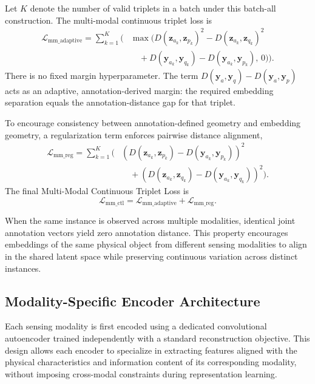 \documentclass[lettersize,journal]{IEEEtran}
\begin{document}
Let $K$ denote the number of valid triplets in a batch under this batch-all construction. The multi-modal continuous triplet loss is
\begin{equation}
\label{eq:mm-adaptive}
\begin{aligned}
\mathcal{L}_{\text{mm\_adaptive}}
=
\sum_{k=1}^{K}
\Big(
& \max\!\big(
D(\mathbf{z}_{a_k},\mathbf{z}_{p_k})^2
-
D(\mathbf{z}_{a_k},\mathbf{z}_{q_k})^2 \\
& \quad +
D(\mathbf{y}_{a_k},\mathbf{y}_{q_k})
-
D(\mathbf{y}_{a_k},\mathbf{y}_{p_k}),
\, 0
\big)
\Big).
\end{aligned}
\end{equation}
There is no fixed margin hyperparameter. The term $D(\mathbf{y}_{a},\mathbf{y}_{q})-D(\mathbf{y}_{a},\mathbf{y}_{p})$ acts as an adaptive, annotation-derived margin: the required embedding separation equals the annotation-distance gap for that triplet.

To encourage consistency between annotation-defined geometry and embedding
geometry, a regularization term enforces pairwise distance alignment,
\begin{equation}
\label{eq:mm-reg}
\begin{aligned}
\mathcal{L}_{\text{mm\_reg}}
=
\sum_{k=1}^{K}
\Big(
& \left(
D(\mathbf{z}_{a_k},\mathbf{z}_{p_k})
-
D(\mathbf{y}_{a_k},\mathbf{y}_{p_k})
\right)^2 \\
& \quad +
\left(
D(\mathbf{z}_{a_k},\mathbf{z}_{q_k})
-
D(\mathbf{y}_{a_k},\mathbf{y}_{q_k})
\right)^2
\Big).
\end{aligned}
\end{equation}
The final Multi-Modal Continuous Triplet Loss is
\begin{equation}
\mathcal{L}_{\text{mm\_ctl}}
=
\mathcal{L}_{\text{mm\_adaptive}}
+
\mathcal{L}_{\text{mm\_reg}}.
\end{equation}

When the same instance is observed across multiple modalities, identical joint
annotation vectors yield zero annotation distance. This property encourages
embeddings of the same physical object from different sensing modalities to
align in the shared latent space while preserving continuous variation across
distinct instances.


\subsection{Modality-Specific Encoder Architecture}

Each sensing modality is first encoded using a dedicated convolutional autoencoder trained independently with a standard reconstruction objective. This design allows each encoder to specialize in extracting features aligned with the physical characteristics and information content of its corresponding modality, without imposing cross-modal constraints during representation learning.
\end{document}
